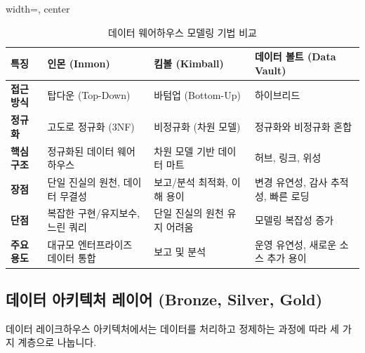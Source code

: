 \documentclass[11pt,a4paper]{article}
\theoremstyle{definition}
\begin{document}
\begin{table}[h!]
\centering
\caption{데이터 웨어하우스 모델링 기법 비교}
\label{tab:dwh_modeling_comparison}
\begin{adjustbox}{width=\textwidth, center}
\begin{tabular}{p{}p{}p{}p{}}
\toprule
\textbf{특징} & \textbf{인몬 (Inmon)} & \textbf{킴볼 (Kimball)} & \textbf{데이터 볼트 (Data Vault)} \\
\midrule
\textbf{접근 방식} & 탑다운 (Top-Down) & 바텀업 (Bottom-Up) & 하이브리드 \\
\textbf{정규화} & 고도로 정규화 (3NF) & 비정규화 (차원 모델) & 정규화와 비정규화 혼합 \\
\textbf{핵심 구조} & 정규화된 데이터 웨어하우스 & 차원 모델 기반 데이터 마트 & 허브, 링크, 위성 \\
\textbf{장점} & 단일 진실의 원천, 데이터 무결성 & 보고/분석 최적화, 이해 용이 & 변경 유연성, 감사 추적성, 빠른 로딩 \\
\textbf{단점} & 복잡한 구현/유지보수, 느린 쿼리 & 단일 진실의 원천 유지 어려움 & 모델링 복잡성 증가 \\
\textbf{주요 용도} & 대규모 엔터프라이즈 데이터 통합 & 보고 및 분석 & 운영 유연성, 새로운 소스 추가 용이 \\
\bottomrule
\end{tabular}
\end{adjustbox}
\end{table}

\subsection{데이터 아키텍처 레이어 (Bronze, Silver, Gold)}
데이터 레이크하우스 아키텍처에서는 데이터를 처리하고 정제하는 과정에 따라 세 가지 계층으로 나눕니다.
\end{document}

